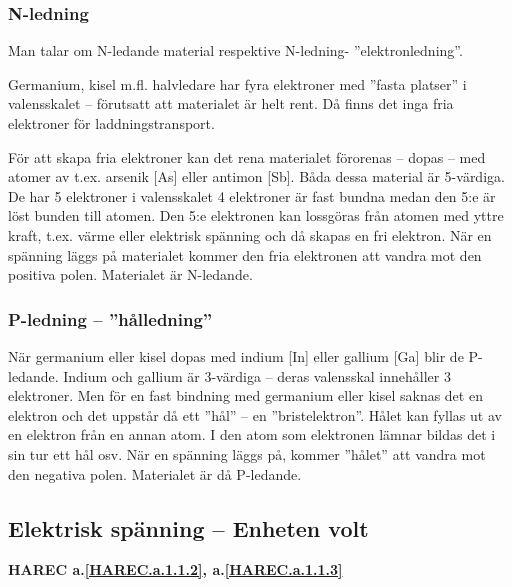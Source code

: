 \subsubsection{N-ledning}
Man talar om N-ledande material respektive N-ledning- ''elektronledning''.

Germanium, kisel m.fl. halvledare har fyra elektroner med ''fasta platser'' i
valensskalet -- förutsatt att materialet är helt rent.
Då finns det inga fria elektroner för laddningstransport.

För att skapa fria elektroner kan det rena materialet förorenas -- dopas -- med
atomer av t.ex. arsenik [As] eller antimon [Sb].
Båda dessa material är 5-värdiga.
De har 5 elektroner i valensskalet 4 elektroner är fast bundna medan
den 5:e är löst bunden till atomen.
Den 5:e elektronen kan lossgöras från atomen med yttre kraft, t.ex. värme eller
elektrisk spänning och då skapas en fri elektron.
När en spänning läggs på materialet kommer den fria elektronen att vandra mot
den positiva polen.
Materialet är N-ledande.

\subsubsection{P-ledning -- ''hålledning''}
När germanium eller kisel dopas med indium [In] eller gallium [Ga] blir de
P-ledande.
Indium och gallium är 3-värdiga -- deras valensskal innehåller 3 elektroner.
Men för en fast bindning med germanium eller kisel saknas det en elektron och
det uppstår då ett ''hål'' -- en ''bristelektron''.
Hålet kan fyllas ut av en elektron från en annan atom.
I den atom som elektronen lämnar bildas det i sin tur ett hål osv.
När en spänning läggs på, kommer ''hålet'' att vandra mot den negativa polen.
Materialet är då P-ledande.

\subsection{Elektrisk spänning -- Enheten volt}
\textbf{HAREC a.\ref{HAREC.a.1.1.2}\label{myHAREC.a.1.1.2b}, a.\ref{HAREC.a.1.1.3}\label{myHAREC.a.1.1.3b}}

